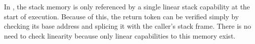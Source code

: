 \documentclass[acmsmall,screen]{acmart}\settopmatter{}
\begin{document}

In \stktokens{}, the stack memory is only referenced by a single linear stack capability at the start of execution.
Because of this, the return token can be verified simply by checking its base address and splicing it with the caller's stack frame.
There is no need to check linearity because only linear capabilities to this memory exist.
\end{document}
